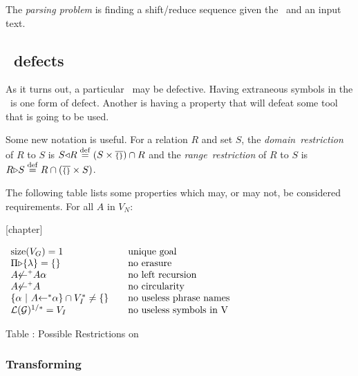 \begin{enumerate}
The {\em parsing problem\/} is finding a shift/reduce sequence given the
\cfg\ and an input text.

\subsection{\cfg\ defects}

As it turns out, a particular \cfg\ may be defective.  
Having extraneous symbols in the \cfg\ is one form of defect.  
Another is having a property that will defeat some tool that is going
to be used.  

Some new notation is useful.
For a relation $R$ and set $S$, the \mbox{\em domain restriction} of 
$R$ to $S$ is $S {\triangleleft} R \stackrel{\rm def}{=} (S \times \mbox{$\overline{\scriptstyle\{\}}$}) \cap R$ 
and the \mbox{\em range restriction} of $R$ to $S$
is $R{\triangleright} S \stackrel{\rm def}{=} R \cap (\mbox{$\overline{\scriptstyle\{\}}$}\times S)$.

The following table lists some properties which may, or may not, be
considered requirements.  For all $A$ in $V_N$:

\vspace{1em}

{}[chapter]
\setcounter{GrammarLimits}{\value{table}}

\begin{samepage}
\quad\quad\quad\quad$
\begin{array}{lll}
{\rm size}(V_G) = 1 
                && \mbox{unique goal}				\\
\Pi{\triangleright}\{\lambda\}=\{\}
		&& \mbox{no erasure}				\\
A\mbox{$\not\leftarrow$}^{\scriptscriptstyle+}A\alpha
		&& \mbox{no left recursion}			\\
A\mbox{$\not\leftarrow$}^{\scriptscriptstyle+}A
		&& \mbox{no circularity}			\\
\{\alpha\ |\ A\mbox{$\leftarrow$}^*\alpha\}\cap V_I^*\not=\{\}
		&& \mbox{no useless phrase names}		\\
{\cal L}({\cal G})^{1/*} = V_I
		&& \mbox{no useless symbols in V}
\end{array}
$
\end{samepage}

\begin{center}
Table \thetable: Possible Restrictions on 
\end{center}

\subsubsection{Transforming }


\end{enumerate}
